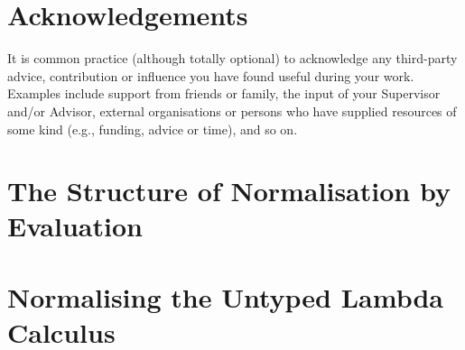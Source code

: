 \documentclass[ %
                    author={Lucas O'Dowd-Jones},
                supervisor={Dr. Alex Kavvos},
                    degree={MEng},
                     title={Variations on Normalisation by Evaluation in Haskell},
                  subtitle={},
                      type={programming languages},
                      year={2021} ]{dissertation}
\begin{document}

\chapter*{Acknowledgements}


\noindent
It is common practice (although totally optional) to acknowledge any
third-party advice, contribution or influence you have found useful
during your work.  Examples include support from friends or family, 
the input of your Supervisor and/or Advisor, external organisations 
or persons who  have supplied resources of some kind (e.g., funding, 
advice or time), and so on.


%

\mainmatter





\chapter{The Structure of Normalisation by Evaluation}
\label{chap:nbestructure}


\chapter{Normalising the Untyped Lambda Calculus}
\label{chap:untypednbe}
\end{document}
